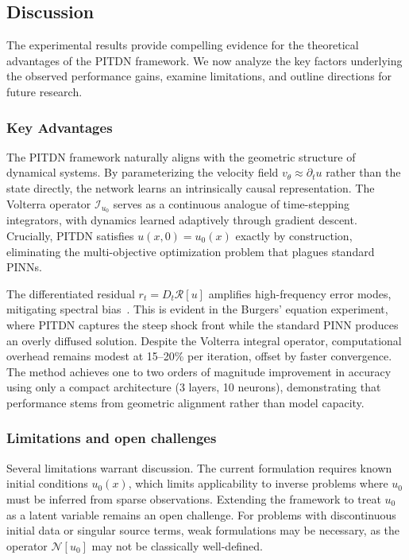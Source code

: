 \documentclass[11pt,reqno]{amsart}
\theoremstyle{plain}
\theoremstyle{definition}
\theoremstyle{remark}
\begin{document}
\subsection{Discussion}\label{sec:discussion}

The experimental results provide compelling evidence for the theoretical advantages of the PITDN framework. We now analyze the key factors underlying the observed performance gains, examine limitations, and outline directions for future research.

\subsubsection{Key Advantages}

The PITDN framework naturally aligns with the geometric structure of dynamical systems. By parameterizing the velocity field $v_\theta \approx \partial_t u$ rather than the state directly, the network learns an intrinsically causal representation. The Volterra operator $\mathcal{I}_{u_0}$ serves as a continuous analogue of time-stepping integrators, with dynamics learned adaptively through gradient descent. Crucially, PITDN satisfies $u(x,0) = u_0(x)$ exactly by construction, eliminating the multi-objective optimization problem that plagues standard PINNs.

The differentiated residual $r_t = D_t \mathcal{R}[u]$ amplifies high-frequency error modes, mitigating spectral bias~\cite{rahaman2019}. This is evident in the Burgers' equation experiment, where PITDN captures the steep shock front while the standard PINN produces an overly diffused solution. Despite the Volterra integral operator, computational overhead remains modest at 15--20\% per iteration, offset by faster convergence. The method achieves one to two orders of magnitude improvement in accuracy using only a compact architecture (3 layers, 10 neurons), demonstrating that performance stems from geometric alignment rather than model capacity.

\subsubsection{Limitations and open challenges}

Several limitations warrant discussion. The current formulation requires known initial conditions $u_0(x)$, which limits applicability to inverse problems where $u_0$ must be inferred from sparse observations. Extending the framework to treat $u_0$ as a latent variable remains an open challenge. For problems with discontinuous initial data or singular source terms, weak formulations may be necessary, as the operator $\mathcal{N}[u_0]$ may not be classically well-defined.
\end{document}
